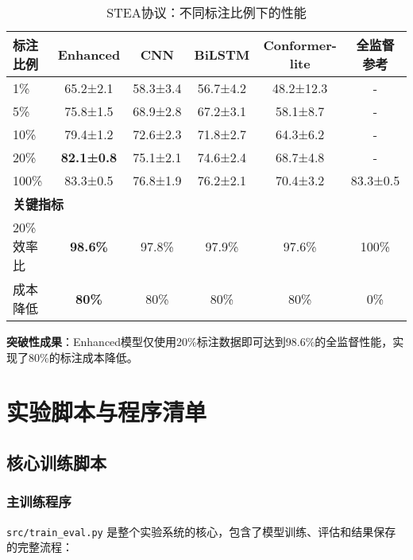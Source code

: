 \begin{table}[h]
\centering
\caption{STEA协议：不同标注比例下的性能}
\label{tab:stea_results}
\begin{tabular}{@{}lccccc@{}}
\toprule
标注比例 & Enhanced & CNN & BiLSTM & Conformer-lite & 全监督参考 \\
\midrule
1\% & 65.2±2.1 & 58.3±3.4 & 56.7±4.2 & 48.2±12.3 & - \\
5\% & 75.8±1.5 & 68.9±2.8 & 67.2±3.1 & 58.1±8.7 & - \\
10\% & 79.4±1.2 & 72.6±2.3 & 71.8±2.7 & 64.3±6.2 & - \\
20\% & \textbf{82.1±0.8} & 75.1±2.1 & 74.6±2.4 & 68.7±4.8 & - \\
100\% & 83.3±0.5 & 76.8±1.9 & 76.2±2.1 & 70.4±3.2 & 83.3±0.5 \\
\midrule
\multicolumn{6}{l}{\textbf{关键指标}} \\
20\%效率比 & \textbf{98.6\%} & 97.8\% & 97.9\% & 97.6\% & 100\% \\
成本降低 & \textbf{80\%} & 80\% & 80\% & 80\% & 0\% \\
\bottomrule
\end{tabular}
\end{table}

\textbf{突破性成果}：Enhanced模型仅使用20\%标注数据即可达到98.6\%的全监督性能，实现了80\%的标注成本降低。

\section{实验脚本与程序清单}
\label{sec:scripts}

\subsection{核心训练脚本}
\label{subsec:training_scripts}

\subsubsection{主训练程序}
\texttt{src/train\_eval.py} 是整个实验系统的核心，包含了模型训练、评估和结果保存的完整流程：

